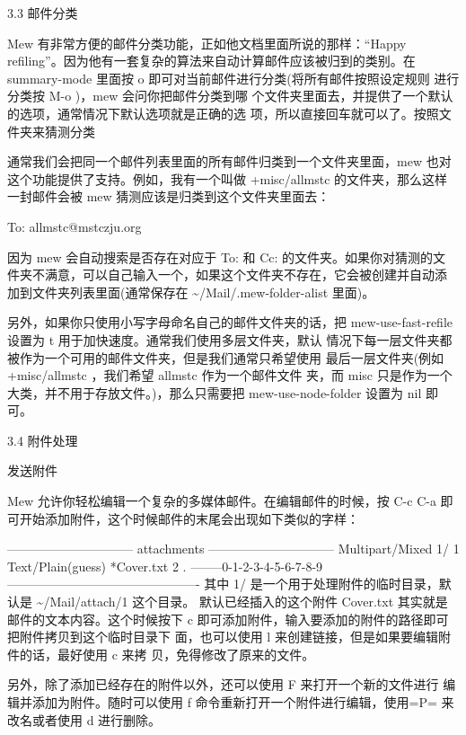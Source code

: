 \documentclass[11pt]{article}
\begin{document}
3.3 邮件分类

Mew 有非常方便的邮件分类功能，正如他文档里面所说的那样：“Happy refiling”。因为他有一套复杂的算法来自动计算邮件应该被归到的类别。在 summary-mode 里面按 o 即可对当前邮件进行分类(将所有邮件按照设定规则 进行分类按 M-o )，mew 会问你把邮件分类到哪 个文件夹里面去，并提供了一个默认的选项，通常情况下默认选项就是正确的选 项，所以直接回车就可以了。按照文件夹来猜测分类

通常我们会把同一个邮件列表里面的所有邮件归类到一个文件夹里面，mew 也对 这个功能提供了支持。例如，我有一个叫做 +misc/allmstc 的文件夹，那么这样 一封邮件会被 mew 猜测应该是归类到这个文件夹里面去：

To: allmstc@mstczju.org

因为 mew 会自动搜索是否存在对应于 To: 和 Cc: 的文件夹。如果你对猜测的文 件夹不满意，可以自己输入一个，如果这个文件夹不存在，它会被创建并自动添 加到文件夹列表里面(通常保存在 \~{}/Mail/.mew-folder-alist 里面)。

另外，如果你只使用小写字母命名自己的邮件文件夹的话，把 mew-use-fast-refile 设置为 t 用于加快速度。通常我们使用多层文件夹，默认 情况下每一层文件夹都被作为一个可用的邮件文件夹，但是我们通常只希望使用 最后一层文件夹(例如 +misc/allmstc ，我们希望 allmstc 作为一个邮件文件 夹，而 misc 只是作为一个大类，并不用于存放文件。)，那么只需要把 mew-use-node-folder 设置为 nil 即可。

3.4 附件处理

发送附件

Mew 允许你轻松编辑一个复杂的多媒体邮件。在编辑邮件的时候，按 C-c C-a 即可开始添加附件，这个时候邮件的末尾会出现如下类似的字样：

------------------------------ attachments ------------------------------
      Multipart/Mixed                                                                   1/
     1  Text/Plain(guess)                                                                 *Cover.txt
     2                                                                                    .
--------0-1-2-3-4-5-6-7-8-9----------------------------------------------
其中 1/ 是一个用于处理附件的临时目录，默认是 \~{}/Mail/attach/1 这个目录。 默认已经插入的这个附件 Cover.txt 其实就是邮件的文本内容。这个时候按下 c 即可添加附件，输入要添加的附件的路径即可把附件拷贝到这个临时目录下 面，也可以使用 l 来创建链接，但是如果要编辑附件的话，最好使用 c 来拷 贝，免得修改了原来的文件。

另外，除了添加已经存在的附件以外，还可以使用 F 来打开一个新的文件进行 编辑并添加为附件。随时可以使用 f 命令重新打开一个附件进行编辑，使用=P= 来改名或者使用 d 进行删除。
\end{document}
